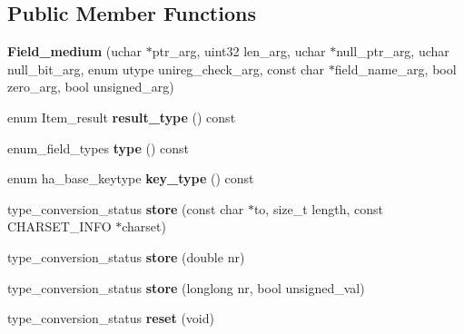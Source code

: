 \subsection*{Public Member Functions}
\begin{DoxyCompactItemize}
\item 
\mbox{\label{classField__medium_aadaa2faa289c75b30d5660179dac92af}} 
{\bfseries Field\+\_\+medium} (uchar $\ast$ptr\+\_\+arg, uint32 len\+\_\+arg, uchar $\ast$null\+\_\+ptr\+\_\+arg, uchar null\+\_\+bit\+\_\+arg, enum utype unireg\+\_\+check\+\_\+arg, const char $\ast$field\+\_\+name\+\_\+arg, bool zero\+\_\+arg, bool unsigned\+\_\+arg)
\item 
\mbox{\label{classField__medium_a38b351d327f2be3510188ce6ae34fe85}} 
enum Item\+\_\+result {\bfseries result\+\_\+type} () const
\item 
\mbox{\label{classField__medium_aaa417f6aab617a365b680693ba1983c4}} 
enum\+\_\+field\+\_\+types {\bfseries type} () const
\item 
\mbox{\label{classField__medium_ae61a7b06e7eb333bcd8a4ac5113ed460}} 
enum ha\+\_\+base\+\_\+keytype {\bfseries key\+\_\+type} () const
\item 
\mbox{\label{classField__medium_acf130697738760b3f69149b4064602c9}} 
type\+\_\+conversion\+\_\+status {\bfseries store} (const char $\ast$to, size\+\_\+t length, const C\+H\+A\+R\+S\+E\+T\+\_\+\+I\+N\+FO $\ast$charset)
\item 
\mbox{\label{classField__medium_afdfae03f7aeae535bf7f6d6dd26c4fc2}} 
type\+\_\+conversion\+\_\+status {\bfseries store} (double nr)
\item 
\mbox{\label{classField__medium_a9e627a7696bfb7af4d11a61a970a6dd2}} 
type\+\_\+conversion\+\_\+status {\bfseries store} (longlong nr, bool unsigned\+\_\+val)
\item 
\mbox{\label{classField__medium_ab68e89d059bbe244278cbb0db7d35221}} 
type\+\_\+conversion\+\_\+status {\bfseries reset} (void)
\item 
\mbox{\label{classField__medium_ae36ddede7b3cd78b3b2e422ca5033711}} 

\end{DoxyCompactItemize}
